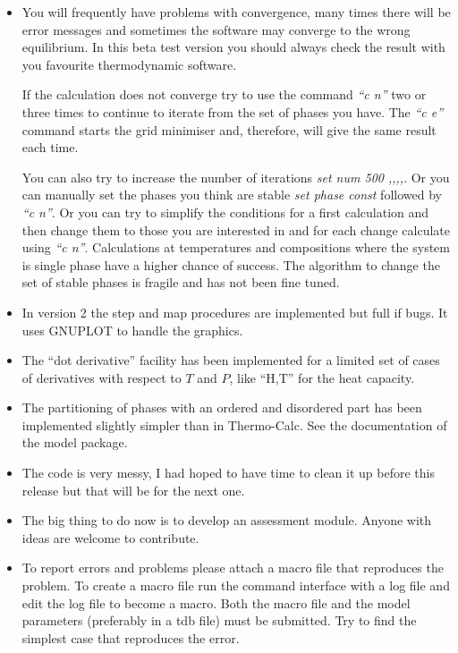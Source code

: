\documentclass[12pt]{article}
\begin{document}
\begin{itemize}
\item You will frequently have problems with convergence, many times
  there will be error messages and sometimes the software may converge
  to the wrong equilibrium.  In this beta test version you should
  always check the result with you favourite thermodynamic software.

  If the calculation does not converge try to use the command {\em ``c
    n''} two or three times to continue to iterate from the set of
  phases you have.  The {\em ``c e''} command starts the grid
  minimiser and, therefore, will give the same result each time.

  You can also try to increase the number of iterations {\em set num
    500 ,,,,}.  Or you can manually set the phases you think are
  stable {\em set phase const} followed by {\em ``c n''}.  Or you can
  try to simplify the conditions for a first calculation and then
  change them to those you are interested in and for each change
  calculate using {\em ``c n''}.  Calculations at temperatures and
  compositions where the system is single phase have a higher chance
  of success.  The algorithm to change the set of stable phases is
  fragile and has not been fine tuned.

\item In version 2 the step and map procedures are implemented but
  full if bugs.  It uses GNUPLOT to handle the graphics.  

\item The ``dot derivative'' facility has been implemented for a
  limited set of cases of derivatives with respect to $T$ and $P$,
  like ``H,T'' for the heat capacity.  

\item The partitioning of phases with an ordered and disordered part
  has been implemented slightly simpler than in Thermo-Calc.  See the
  documentation of the model package.

\item The code is very messy, I had hoped to have time to clean it up
  before this release but that will be for the next one.

\item The big thing to do now is to develop an assessment module.
  Anyone with ideas are welcome to contribute.

\item To report errors and problems please attach a macro file that
  reproduces the problem.  To create a macro file run the command
  interface with a log file and edit the log file to become a macro.
  Both the macro file and the model parameters (preferably in a tdb
  file) must be submitted.  Try to find the simplest case that
  reproduces the error.

\end{itemize}
\end{document}
